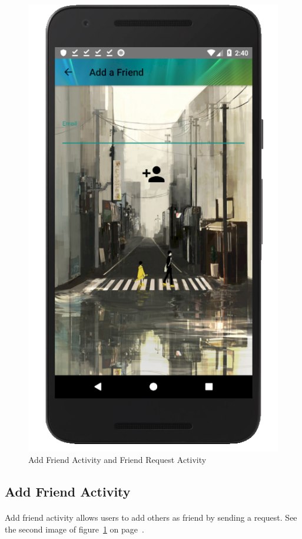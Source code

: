 \documentclass[12pt]{article}
\begin{document}
\begin{figure}
	\includegraphics[scale=0.25]{AddFriend.png}

	\caption{\label{fig:requestAdd}Add Friend Activity and Friend Request Activity}
\end{figure}

\subsection{Add Friend Activity}
\paragraph{}
Add friend activity allows users to add others as friend by sending a request. See the second image of figure~\ref{fig:requestAdd} on page~\pageref{fig:requestAdd}.
\end{document}

